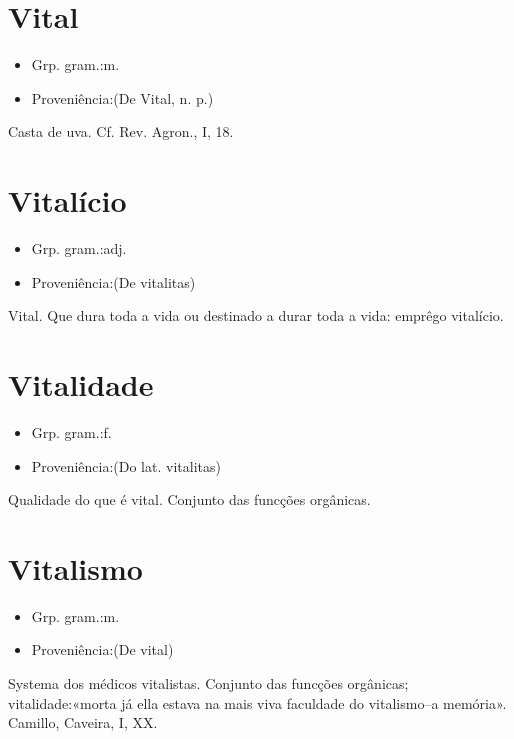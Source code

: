 \documentclass{article}
\begin{document}
\section{Vital}
\begin{itemize}
\item {Grp. gram.:m.}
\end{itemize}
\begin{itemize}
\item {Proveniência:(De \textunderscore Vital\textunderscore , n. p.)}
\end{itemize}
Casta de uva. Cf. \textunderscore Rev. Agron.\textunderscore , I, 18.
\section{Vitalício}
\begin{itemize}
\item {Grp. gram.:adj.}
\end{itemize}
\begin{itemize}
\item {Proveniência:(De \textunderscore vitalitas\textunderscore )}
\end{itemize}
Vital.
Que dura toda a vida ou destinado a durar toda a vida: \textunderscore emprêgo vitalício\textunderscore .
\section{Vitalidade}
\begin{itemize}
\item {Grp. gram.:f.}
\end{itemize}
\begin{itemize}
\item {Proveniência:(Do lat. \textunderscore vitalitas\textunderscore )}
\end{itemize}
Qualidade do que é vital.
Conjunto das funcções orgânicas.
\section{Vitalismo}
\begin{itemize}
\item {Grp. gram.:m.}
\end{itemize}
\begin{itemize}
\item {Proveniência:(De \textunderscore vital\textunderscore )}
\end{itemize}
Systema dos médicos vitalistas.
Conjunto das funcções orgânicas; vitalidade:«\textunderscore morta já ella estava na mais viva faculdade do vitalismo--a memória\textunderscore ». Camillo, \textunderscore Caveira\textunderscore , I, XX.
\end{document}
